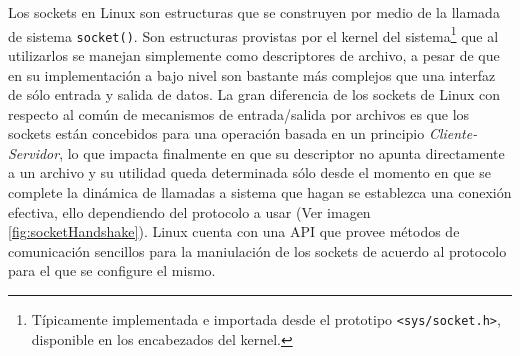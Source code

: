 Los sockets en Linux \cite{rfc:147, book:sockets} son estructuras que se construyen por medio de la llamada de sistema \verb=socket()=. Son estructuras provistas por el kernel del sistema\footnote{Típicamente implementada e importada desde el prototipo \verb=<sys/socket.h>=, disponible en los encabezados del kernel.} que al utilizarlos se manejan simplemente como descriptores de archivo, a pesar de que en su implementación a bajo nivel son bastante más complejos que una interfaz de sólo entrada y salida de datos. La gran diferencia de los sockets de Linux con respecto al común de mecanismos de entrada/salida por archivos es que los sockets están concebidos para una operación basada en un principio \emph{Cliente-Servidor}, lo que impacta finalmente en que su descriptor no apunta directamente a un archivo y su utilidad queda determinada sólo desde el momento en que se complete la dinámica de llamadas a sistema que hagan se establezca una conexión efectiva, ello dependiendo del protocolo a usar (Ver imagen \ref{fig:socketHandshake}). Linux cuenta con una API que provee métodos de comunicación sencillos para la maniulación de los sockets de acuerdo al protocolo para el que se configure el mismo.

